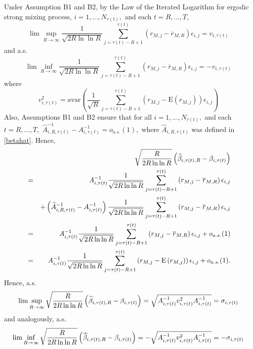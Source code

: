 Under Assumption B1 and B2, by the Law of the Iterated
Logarithm for ergodic strong mixing process, $i=1,...,N_{\tau(t)},$ and each
$t=R,...,T,$%
\begin{equation*}
\lim \sup_{R\rightarrow \infty }\frac{1}{\sqrt{2R\ln \ln R}}%
\sum_{j=\tau(t)-R+1}^{\tau(t)}\left( r_{M,j}-\overline{r}_{M,R}\right) \epsilon
_{i,j}=v_{i,\tau(t)}
\end{equation*}%
and a.s.%
\begin{equation*}
\lim \inf_{R\rightarrow \infty }\frac{1}{\sqrt{2R\ln \ln R}}%
\sum_{j=\tau(t)-R+1}^{\tau(t)}\left( r_{M,j}-\overline{r}_{M,R}\right) \epsilon
_{i,j}=-v_{i,\tau(t)}
\end{equation*}%
where 
\begin{equation*}
v_{i,\tau(t)}^{2}=\mathrm{avar}\left( \frac{1}{\sqrt{R}}\sum_{j=\tau(t)-R+1}^{\tau(t)}\left( r_{M,j}-\mathrm{E}\left( r_{M,j}\right) \right)
\epsilon _{i,j}\right)
\end{equation*}%
Also, Assumptions B1 and B2 ensure that for all $i=1,...,N_{\tau(t)},$ and
each $t=R,...,T,$ $\widehat{A}_{i,R,\tau(t)}^{-1}-A_{i,\tau(t)}^{-1}=o_{a.s.}%
(1),$ where $\widehat{A}_{i,R,\tau(t)}$ was defined in \eqref{betahat}. Hence,%
\begin{eqnarray*}
&&\sqrt{\frac{R}{2R\ln \ln R}}\left( \widehat{\beta }_{i,\tau(t),R}-\beta _{i,\tau(t)}\right) \\
&=&A_{i,\tau(t)}^{-1}\frac{1}{\sqrt{2R\ln \ln R}}%
\sum_{j=\tau(t)-R+1}^{\tau(t)}\left( r_{M,j}-\overline{r}_{M,R}\right) \epsilon _{i,j} \\
&&+\left( \widehat{A}_{i,R,\tau(t)}^{-1}-A_{i,\tau(t)}^{-1}\right) \frac{1}{\sqrt{%
2R\ln \ln R}}\sum_{j=\tau(t)-R+1}^{\tau(t)}\left( r_{M,j}-\overline{r}_{M,R}\right) \epsilon
_{i,j} \\
&=&A_{i,\tau(t)}^{-1}\frac{1}{\sqrt{2R\ln \ln R}}%
\sum_{j=\tau(t)-R+1}^{\tau(t)}\left( r_{M,j}-\overline{r}_{M,R}\right) \epsilon
_{i,j}+o_{a.s.}(1) \\
&=&A_{i,\tau(t)}^{-1}\frac{1}{\sqrt{2R\ln \ln R}}%
\sum_{j=\tau(t)-R+1}^{\tau(t)}\left( r_{M,j}-\mathrm{E}\left( r_{M,j}\right) \right)
\epsilon _{i,j}+o_{a.s.}(1).
\end{eqnarray*}%
Hence, a.s.%
\begin{equation*}
\lim \sup_{R\rightarrow \infty }\sqrt{\frac{R}{2R\ln \ln R}}\left( \widehat{%
\beta }_{i,\tau(t),R}-\beta _{i,\tau(t)}\right) =\sqrt{A_{i,\tau(t)}^{-1}v_{i,\tau(t)}^{2}A_{i,\tau(t)}^{-1}}=\sigma _{i,\tau(t)}
\end{equation*}%
and analogously, a.s.%
\begin{equation*}
\lim \inf_{R\rightarrow \infty }\sqrt{\frac{R}{2R\ln \ln R}}\left( \widehat{%
\beta }_{i,\tau(t),R}-\beta _{i,\tau(t)}\right) =-\sqrt{A_{i,\tau(t)}^{-1}v_{i,\tau(t)}^{2}A_{i,\tau(t)}^{-1}}=-\sigma _{i,\tau(t)}
\end{equation*}

